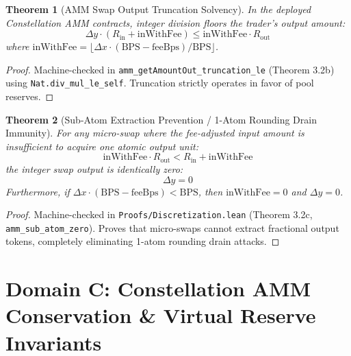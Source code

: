 \documentclass[11pt,a4paper]{article}
\theoremstyle{plain}
\newtheorem{theorem}{Theorem}[section]
\theoremstyle{definition}
\theoremstyle{remark}
\begin{document}
\begin{theorem}[AMM Swap Output Truncation Solvency]
\label{thm:amm_trunc}
In the deployed Constellation AMM contracts, integer division floors the trader's output amount:
\begin{equation}
    \Delta y \cdot (R_{\text{in}} + \text{inWithFee}) \le \text{inWithFee} \cdot R_{\text{out}}
\end{equation}
where $\text{inWithFee} = \lfloor \Delta x \cdot (\text{BPS} - \text{feeBps}) / \text{BPS} \rfloor$.
\end{theorem}
\begin{proof}
Machine-checked in \texttt{amm\_getAmountOut\_truncation\_le} (Theorem 3.2b) using \texttt{Nat.div\_mul\_le\_self}. Truncation strictly operates in favor of pool reserves.
\end{proof}

\begin{theorem}[Sub-Atom Extraction Prevention / 1-Atom Rounding Drain Immunity]
\label{thm:amm_subatom}
For any micro-swap where the fee-adjusted input amount is insufficient to acquire one atomic output unit:
\begin{equation}
    \text{inWithFee} \cdot R_{\text{out}} < R_{\text{in}} + \text{inWithFee}
\end{equation}
the integer swap output is identically zero:
\begin{equation}
    \Delta y = 0
\end{equation}
Furthermore, if $\Delta x \cdot (\text{BPS} - \text{feeBps}) < \text{BPS}$, then $\text{inWithFee} = 0$ and $\Delta y = 0$.
\end{theorem}
\begin{proof}
Machine-checked in \texttt{Proofs/Discretization.lean} (Theorem 3.2c, \texttt{amm\_sub\_atom\_zero}). Proves that micro-swaps cannot extract fractional output tokens, completely eliminating 1-atom rounding drain attacks.
\end{proof}

\section{Domain C: Constellation AMM Conservation \& Virtual Reserve Invariants}
\end{document}
